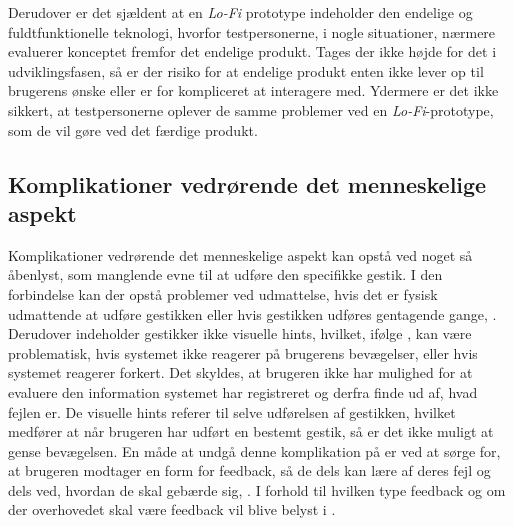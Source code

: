 Derudover er det sjældent at en \textit{Lo-Fi} prototype indeholder den endelige og fuldtfunktionelle teknologi, hvorfor testpersonerne, i nogle situationer, nærmere evaluerer konceptet fremfor det endelige produkt. Tages der ikke højde for det i udviklingsfasen, så er der risiko for at endelige produkt enten ikke lever op til brugerens ønske eller er for kompliceret at interagere med. Ydermere er det ikke sikkert, at testpersonerne oplever de samme problemer ved en \textit{Lo-Fi}-prototype, som de vil gøre ved det færdige produkt.   
%
\subsection{Komplikationer vedrørende det menneskelige aspekt}
\label{KomplikationerVedroerendeDetMenneskelige}
%
Komplikationer vedrørende det menneskelige aspekt kan opstå ved noget så åbenlyst, som manglende evne til at udføre den specifikke gestik. I den forbindelse kan der opstå problemer ved udmattelse, hvis det er fysisk udmattende at udføre gestikken eller hvis gestikken udføres gentagende gange, \parencite[s. 28]{PDF:ATaxonomyOfGestures}. Derudover indeholder gestikker ikke visuelle hints, hvilket, ifølge \textcite[s. 6]{PDF:NaturalUserInterfaces}, kan være problematisk, hvis systemet ikke reagerer på brugerens bevægelser, eller hvis systemet reagerer forkert. Det skyldes, at brugeren ikke har mulighed for at evaluere den information systemet har registreret og derfra finde ud af, hvad fejlen er. De visuelle hints referer til selve udførelsen af gestikken, hvilket medfører at når brugeren har udført en bestemt gestik, så er det ikke muligt at gense bevægelsen. En måde at undgå denne komplikation på er ved at sørge for, at brugeren modtager en form for feedback, så de dels kan lære af deres fejl og dels ved, hvordan de skal gebærde sig, \parencite[s. 10]{PDF:NaturalUserInterfaces}. I forhold til hvilken type feedback og om der overhovedet skal være feedback vil blive belyst i . \blankline
%
